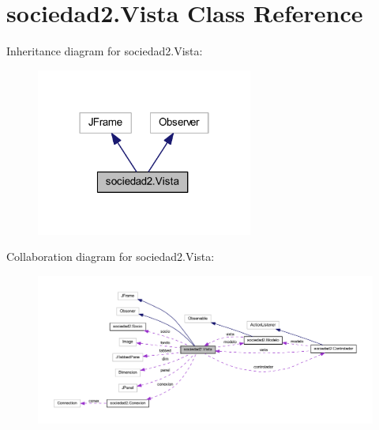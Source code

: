 \hypertarget{classsociedad2_1_1_vista}{}\section{sociedad2.\+Vista Class Reference}
\label{classsociedad2_1_1_vista}


Inheritance diagram for sociedad2.\+Vista\+:\nopagebreak
\begin{figure}[H]
\begin{center}
\leavevmode
\includegraphics[width=202pt]{classsociedad2_1_1_vista__inherit__graph}
\end{center}
\end{figure}


Collaboration diagram for sociedad2.\+Vista\+:
\nopagebreak
\begin{figure}[H]
\begin{center}
\leavevmode
\includegraphics[width=350pt]{classsociedad2_1_1_vista__coll__graph}
\end{center}
\end{figure}
